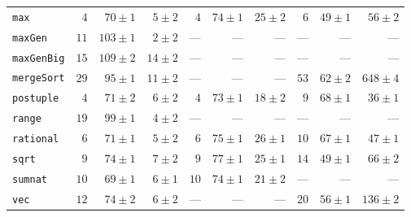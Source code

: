 \begin{table}[t]
\begin{tabular}{l rrr rrr rrr}
\texttt{max} & $4$ & $70 \pm 1$ & $5 \pm 2$ & $4$ & $74 \pm 1$ & $25 \pm 2$ & $6$ & $49 \pm 1$ & $56 \pm 2$ \\
\texttt{maxGen} & $11$ & $103 \pm 1$ & $2 \pm 2$ & --- & --- & --- & --- & --- & --- \\
\texttt{maxGenBig} & $15$ & $109 \pm 2$ & $14 \pm 2$ & --- & --- & --- & --- & --- & --- \\
\texttt{mergeSort} & $29$ & $95 \pm 1$ & $11 \pm 2$ & --- & --- & --- & $53$ & $62 \pm 2$ & $648 \pm 4$ \\
\texttt{postuple} & $4$ & $71 \pm 2$ & $6 \pm 2$ & $4$ & $73 \pm 1$ & $18 \pm 2$ & $9$ & $68 \pm 1$ & $36 \pm 1$ \\
\texttt{range} & $19$ & $99 \pm 1$ & $4 \pm 2$ & --- & --- & --- & --- & --- & --- \\
\texttt{rational} & $6$ & $71 \pm 1$ & $5 \pm 2$ & $6$ & $75 \pm 1$ & $26 \pm 1$ & $10$ & $67 \pm 1$ & $47 \pm 1$ \\
\texttt{sqrt} & $9$ & $74 \pm 1$ & $7 \pm 2$ & $9$ & $77 \pm 1$ & $25 \pm 1$ & $14$ & $49 \pm 1$ & $66 \pm 2$ \\
\texttt{sumnat} & $10$ & $69 \pm 1$ & $6 \pm 1$ & $10$ & $74 \pm 1$ & $21 \pm 2$ & --- & --- & --- \\
\texttt{vec} & $12$ & $74 \pm 2$ & $6 \pm 2$ & --- & --- & --- & $20$ & $56 \pm 1$ & $136 \pm 2$ \\
\bottomrule
\end{tabular}
\end{table}